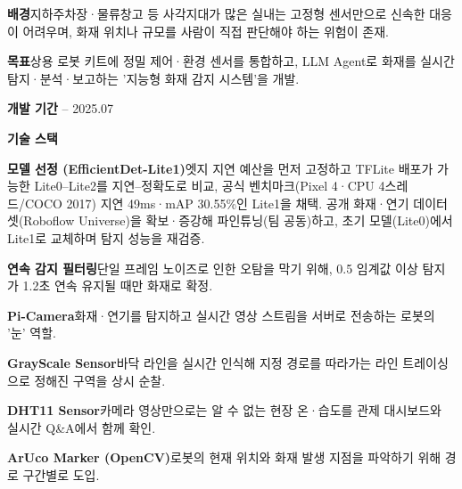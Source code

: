 

\begin{cvitems}
  \item {\textbf{배경}\enskip 지하주차장·물류창고 등 사각지대가 많은 실내는 고정형 센서만으로 신속한 대응이 어려우며, 화재 위치나 규모를 사람이 직접 판단해야 하는 위험이 존재.}
  \item {\textbf{목표}\enskip 상용 로봇 키트에 정밀 제어·환경 센서를 통합하고, LLM Agent로 화재를 실시간 탐지·분석·보고하는 '지능형 화재 감지 시스템'을 개발.}
  \item {\textbf{개발 기간} -- 2025.07}
  \item {\textbf{기술 스택}\enskip {}         }
\end{cvitems}


\begin{cvitems}
  \item {\textbf{모델 선정 (EfficientDet-Lite1)}\enskip 엣지 지연 예산을 먼저 고정하고 TFLite 배포가 가능한 Lite0--Lite2를 지연--정확도로 비교, 공식 벤치마크(Pixel 4·CPU 4스레드/COCO 2017) 지연 49ms·mAP 30.55\%인 Lite1을 채택. 공개 화재·연기 데이터셋(Roboflow Universe)을 확보·증강해 파인튜닝(팀 공동)하고, 초기 모델(Lite0)에서 Lite1로 교체하며 탐지 성능을 재검증.}
  \item {\textbf{연속 감지 필터링}\enskip 단일 프레임 노이즈로 인한 오탐을 막기 위해, 0.5 임계값 이상 탐지가 1.2초 연속 유지될 때만 화재로 확정.}
  \item {\textbf{Pi-Camera}\enskip 화재·연기를 탐지하고 실시간 영상 스트림을 서버로 전송하는 로봇의 '눈' 역할.}
  \item {\textbf{GrayScale Sensor}\enskip 바닥 라인을 실시간 인식해 지정 경로를 따라가는 라인 트레이싱으로 정해진 구역을 상시 순찰.}
  \item {\textbf{DHT11 Sensor}\enskip 카메라 영상만으로는 알 수 없는 현장 온·습도를 관제 대시보드와 실시간 Q\&A에서 함께 확인.}
  \item {\textbf{ArUco Marker (OpenCV)}\enskip 로봇의 현재 위치와 화재 발생 지점을 파악하기 위해 경로 구간별로 도입.}
\end{cvitems}

